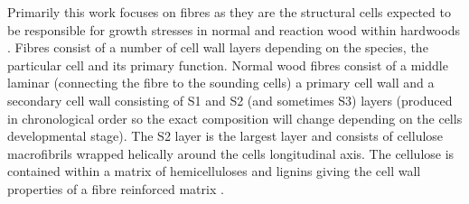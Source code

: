 Primarily this work focuses on fibres as they are the structural cells expected
to be responsible for growth stresses in normal and reaction wood within
hardwoods \cite{archer1987growth}. Fibres consist of a number of cell wall layers depending on
the species, the particular cell and its primary function. Normal wood fibres
consist of a middle laminar (connecting the fibre to
the sounding cells) a primary cell wall and a secondary cell wall consisting of
S1 and S2 (and sometimes S3) layers (produced in chronological order so the exact composition
will change depending on the cells developmental stage)\cite{barnett1981xylem}. The S2 layer is
the largest layer and consists of cellulose macrofibrils wrapped helically
around the cells longitudinal axis. The cellulose is contained within a
matrix of hemicelluloses and lignins giving the cell wall properties
of a fibre reinforced matrix \cite{niklas2012plant}.